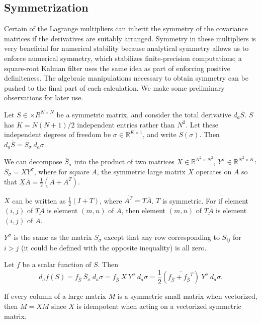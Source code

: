 \documentclass[10pt,fleqn]{article}
\renewcommand{\vec}[1]{\ensuremath{\overline{#1}}}
\newcommand{\unvec}[1]{\ensuremath{\underline{#1}}}
\begin{document}
\subsection{Symmetrization}
Certain of the Lagrange multipliers can inherit the symmetry of the covariance
matrices if the derivatives are suitably arranged. Symmetry in these multipliers
is very beneficial for numerical stability because analytical symmetry allows us
to enforce numerical symmetry, which stabilizes finite-precision computations; a
square-root Kalman filter uses the same idea as part of enforcing positive
definiteness. The algebraic manipulations necessary to obtain symmetry can be
pushed to the final part of each calculation. We make some preliminary
observations for later use.

Let $S \in \times{R}^{N \times N}$ be a symmetric matrix, and consider the total
derivative $d_a \vec S$. $S$ has $K = N (N + 1) / 2$ independent entries rather
than $N^2$. Let these independent degrees of freedom be $\sigma \in
\mathbb{R}^{K \times 1}$, and write $S(\sigma)$. Then $d_a \vec S = \vec
S_{\sigma} \ d_a \sigma$.

We can decompose $\vec S_{\sigma}$ into the product of two matrices $X \in
\mathbb{R}^{N^2 \times N^2}$, $Y^{\sigma} \in \mathbb{R}^{N^2 \times K}$: $\vec
S_{\sigma} = X Y^{\sigma}$, where for square $A$, the symmetric large matrix $X$
operates on $A$ so that $\unvec{X} \vec A = \frac{1}{2}(A + A^T)$.

$X$ can be written as $\frac{1}{2} (I + T)$, where $\vec{A^T} = T \vec A$. $T$
is symmetric. For if element $(i,j)$ of $\unvec{T \vec A}$ is element $(m,n)$ of
$A$, then element $(m,n)$ of $\unvec{T \vec A}$ is element $(i,j)$ of
$A$.

$Y^{\sigma}$ is the same as the matrix $\vec S_{\sigma}$ except that any row
corresponding to $S_{ij}$ for $i > j$ (it could be defined with the opposite
inequality) is all zero.

Let $f$ be a scalar function of $S$. Then
\begin{equation*}
  d_a f(S) = f_{\vec S} \ \vec S_{\sigma} \ d_a \sigma
  = f_{\vec S} \ X \ Y^{\sigma} \ d_a \sigma
  = \frac{1}{2} (\vec{\unvec{f_{\vec S}} + \unvec{f_{\vec S}}^T}) \ Y^{\sigma}
  \ d_a \sigma.
\end{equation*}

If every column of a large matrix $M$ is a symmetric small matrix when
vectorized, then $M = X M$ since $X$ is idempotent when acting on a vectorized
symmetric matrix.
\end{document}

